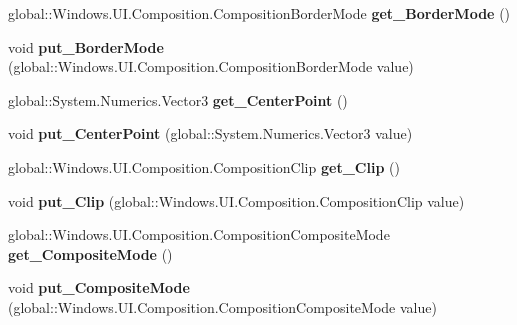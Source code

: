 \begin{DoxyCompactItemize}
global\+::\+Windows.\+U\+I.\+Composition.\+Composition\+Border\+Mode {\bfseries get\+\_\+\+Border\+Mode} ()
\item 
\mbox{\label{interface_windows_1_1_u_i_1_1_composition_1_1_i_visual_a81dd6285766651fb4d55a78808dbfbdf}} 
void {\bfseries put\+\_\+\+Border\+Mode} (global\+::\+Windows.\+U\+I.\+Composition.\+Composition\+Border\+Mode value)
\item 
\mbox{\label{interface_windows_1_1_u_i_1_1_composition_1_1_i_visual_a155a09b37b8789970281666bc3111f3d}} 
global\+::\+System.\+Numerics.\+Vector3 {\bfseries get\+\_\+\+Center\+Point} ()
\item 
\mbox{\label{interface_windows_1_1_u_i_1_1_composition_1_1_i_visual_ac736f9c5171d694ea168970125dee881}} 
void {\bfseries put\+\_\+\+Center\+Point} (global\+::\+System.\+Numerics.\+Vector3 value)
\item 
\mbox{\label{interface_windows_1_1_u_i_1_1_composition_1_1_i_visual_ad0c2e9949756caf002a9224770412cd2}} 
global\+::\+Windows.\+U\+I.\+Composition.\+Composition\+Clip {\bfseries get\+\_\+\+Clip} ()
\item 
\mbox{\label{interface_windows_1_1_u_i_1_1_composition_1_1_i_visual_aa89c3bfb77967afd71d66e1adb50d78a}} 
void {\bfseries put\+\_\+\+Clip} (global\+::\+Windows.\+U\+I.\+Composition.\+Composition\+Clip value)
\item 
\mbox{\label{interface_windows_1_1_u_i_1_1_composition_1_1_i_visual_a8d4c301ec2cd6a02a533dd5077a01dcf}} 
global\+::\+Windows.\+U\+I.\+Composition.\+Composition\+Composite\+Mode {\bfseries get\+\_\+\+Composite\+Mode} ()
\item 
\mbox{\label{interface_windows_1_1_u_i_1_1_composition_1_1_i_visual_a23a31d796c4457b2e748aa0b505ad7c8}} 
void {\bfseries put\+\_\+\+Composite\+Mode} (global\+::\+Windows.\+U\+I.\+Composition.\+Composition\+Composite\+Mode value)

\end{DoxyCompactItemize}
